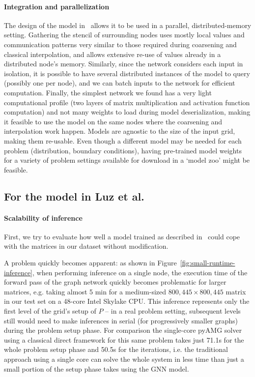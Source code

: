 \documentclass{svproc}
\newcommand{\etal}{et al. }
\begin{document}
\paragraph{Integration and parallelization}
The design of the model in~\cite{Greenfeld2019} allows it to be used in a parallel, distributed-memory setting. Gathering the stencil of surrounding nodes uses mostly local values and communication patterns very similar to those required during coarsening and classical interpolation, and allows extensive re-use of values already in a distributed node's memory. Similarly, since the network considers each input in isolation, it is possible to have several distributed instances of the model to query (possibly one per node), and we can batch inputs to the network for efficient computation. Finally, the simplest network we found has a very light computational profile (two layers of matrix multiplication and activation function computation) and not many weights to load during model deserialization, making it feasible to use the model on the same nodes where the coarsening and interpolation work happen. Models are agnostic to the size of the input grid, making them re-usable. Even though a different model may be needed for each problem (distribution, boundary conditions), having pre-trained model weights for a variety of problem settings available for download in a `model zoo' might be feasible.




\subsection{For the model in Luz \etal}
\paragraph{Scalability of inference}
First, we try to evaluate how well a model trained as described in~\cite{Luz2020} could cope with the matrices in our dataset without modification.

A problem quickly becomes apparent: as shown in Figure~\ref{fig:small-runtime-inference}, when performing inference on a single node, the execution time of the forward pass of the graph network quickly becomes problematic for larger matrices, e.g. taking almost 5 min for a medium-sized $800,445\times800,445$ matrix in our test set on a 48-core Intel Skylake CPU. This inference represents only the first level of the grid's setup of $P$ -- in a real problem setting, subsequent levels still would need to make inferences in serial (for progressively smaller graphs) during the problem setup phase. For comparison the single-core pyAMG \cite{pyamg} solver using a classical direct framework for this same problem takes just 71.1s for the whole problem setup phase and 50.5s for the iterations, i.e. the traditional approach using a single core can solve the whole system in less time than just a small portion of the setup phase takes using the GNN model.
\end{document}
